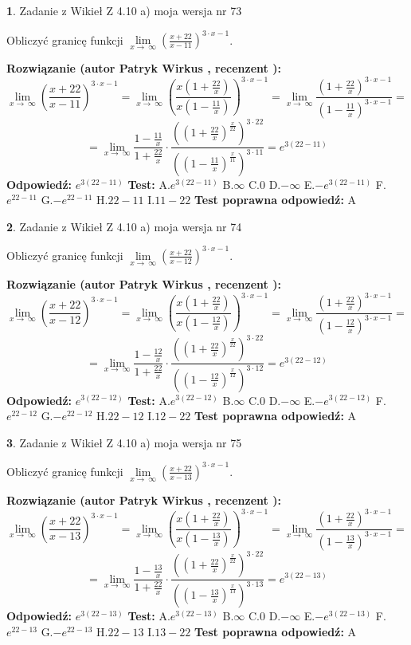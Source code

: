 \documentclass[12pt, a4paper]{article}
\theoremstyle{definition} %
\newtheorem{zad}{}
\newcommand{\zadStart}[1]{\begin{zad}#1\newline}
\newcommand{\zadStop}{\end{zad}}
\newcommand{\rozwStart}[2]{\noindent \textbf{Rozwiązanie (autor #1 , recenzent #2): }\newline}
\newcommand{\rozwStop}{\newline}
\newcommand{\odpStart}{\noindent \textbf{Odpowiedź:}\newline}
\newcommand{\odpStop}{\newline}
\newcommand{\testStart}{\noindent \textbf{Test:}\newline}
\newcommand{\testStop}{\newline}
\newcommand{\kluczStart}{\noindent \textbf{Test poprawna odpowiedź:}\newline}
\newcommand{\kluczStop}{\newline}
\begin{document}
\zadStart{Zadanie z Wikieł Z 4.10 a) moja wersja nr 73}


Obliczyć granicę funkcji  $\lim\limits_{x\to\ \infty}(\frac{x+22}{x-11})^{3\cdot x-1}$.
\zadStop
\rozwStart{Patryk Wirkus}{}
$$\lim\limits_{x\to\ \infty}(\frac{x+22}{x-11})^{3\cdot x-1} = \lim\limits_{x\to\ \infty}(\frac{x(1+\frac{22}{x})}{x(1-\frac{11}{x})})^{3\cdot x-1}=\lim\limits_{x\to\ \infty}\frac{(1+\frac{22}{x})^{3\cdot x-1}}{(1-\frac{11}{x})^{3\cdot x-1}}=$$
$$=\lim\limits_{x\to\ \infty}\frac{1-\frac{11}{x}}{1+\frac{22}{x}}\cdot\frac{((1+\frac{22}{x})^{\frac{x}{22}})^{3\cdot22}}{((1-\frac{11}{x})^{\frac{x}{11}})^{3\cdot11}}=e^{3(22-11)}$$
\rozwStop
\odpStart
$e^{3(22-11)}$
\odpStop
\testStart
A.$e^{3(22-11)}$ B.$\infty$ C.$0$ D.$-\infty$ E.$-e^{3(22-11)}$
F.$e^{22-11}$ G.$-e^{22-11}$
H.$22-11$
I.$11-22$
\testStop
\kluczStart
A
\kluczStop



\zadStart{Zadanie z Wikieł Z 4.10 a) moja wersja nr 74}


Obliczyć granicę funkcji  $\lim\limits_{x\to\ \infty}(\frac{x+22}{x-12})^{3\cdot x-1}$.
\zadStop
\rozwStart{Patryk Wirkus}{}
$$\lim\limits_{x\to\ \infty}(\frac{x+22}{x-12})^{3\cdot x-1} = \lim\limits_{x\to\ \infty}(\frac{x(1+\frac{22}{x})}{x(1-\frac{12}{x})})^{3\cdot x-1}=\lim\limits_{x\to\ \infty}\frac{(1+\frac{22}{x})^{3\cdot x-1}}{(1-\frac{12}{x})^{3\cdot x-1}}=$$
$$=\lim\limits_{x\to\ \infty}\frac{1-\frac{12}{x}}{1+\frac{22}{x}}\cdot\frac{((1+\frac{22}{x})^{\frac{x}{22}})^{3\cdot22}}{((1-\frac{12}{x})^{\frac{x}{12}})^{3\cdot12}}=e^{3(22-12)}$$
\rozwStop
\odpStart
$e^{3(22-12)}$
\odpStop
\testStart
A.$e^{3(22-12)}$ B.$\infty$ C.$0$ D.$-\infty$ E.$-e^{3(22-12)}$
F.$e^{22-12}$ G.$-e^{22-12}$
H.$22-12$
I.$12-22$
\testStop
\kluczStart
A
\kluczStop



\zadStart{Zadanie z Wikieł Z 4.10 a) moja wersja nr 75}


Obliczyć granicę funkcji  $\lim\limits_{x\to\ \infty}(\frac{x+22}{x-13})^{3\cdot x-1}$.
\zadStop
\rozwStart{Patryk Wirkus}{}
$$\lim\limits_{x\to\ \infty}(\frac{x+22}{x-13})^{3\cdot x-1} = \lim\limits_{x\to\ \infty}(\frac{x(1+\frac{22}{x})}{x(1-\frac{13}{x})})^{3\cdot x-1}=\lim\limits_{x\to\ \infty}\frac{(1+\frac{22}{x})^{3\cdot x-1}}{(1-\frac{13}{x})^{3\cdot x-1}}=$$
$$=\lim\limits_{x\to\ \infty}\frac{1-\frac{13}{x}}{1+\frac{22}{x}}\cdot\frac{((1+\frac{22}{x})^{\frac{x}{22}})^{3\cdot22}}{((1-\frac{13}{x})^{\frac{x}{13}})^{3\cdot13}}=e^{3(22-13)}$$
\rozwStop
\odpStart
$e^{3(22-13)}$
\odpStop
\testStart
A.$e^{3(22-13)}$ B.$\infty$ C.$0$ D.$-\infty$ E.$-e^{3(22-13)}$
F.$e^{22-13}$ G.$-e^{22-13}$
H.$22-13$
I.$13-22$
\testStop
\kluczStart
A
\kluczStop
\end{document}
